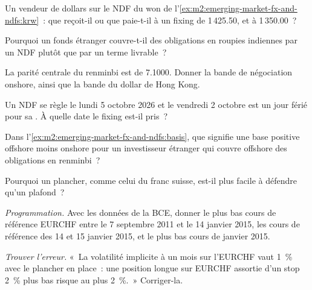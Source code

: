 \begin{exercise}[$\star$]\label{exo:m2:emerging-market-fx-and-ndfs:1}
Un vendeur de dollars sur le NDF du won de l'\cref{ex:m2:emerging-market-fx-and-ndfs:krw}~:
que reçoit-il ou que paie-t-il à un fixing de 1\,425.50, et à 1\,350.00~?
\end{exercise}

\begin{exercise}[$\star$]\label{exo:m2:emerging-market-fx-and-ndfs:2}
Pourquoi un fonds étranger couvre-t-il des obligations en roupies indiennes par un NDF plutôt
que par un terme livrable~?
\end{exercise}

\begin{exercise}[$\star$]\label{exo:m2:emerging-market-fx-and-ndfs:3}
La parité centrale du renminbi est de 7.1000. Donner la bande de négociation onshore, ainsi que la
bande du dollar de Hong Kong.
\end{exercise}

\begin{exercise}[$\star\star$]\label{exo:m2:emerging-market-fx-and-ndfs:4}
Un NDF se règle le lundi 5 octobre 2026 et le vendredi 2 octobre est un jour férié pour sa
. À quelle date le fixing est-il pris~?
\end{exercise}

\begin{exercise}[$\star\star$]\label{exo:m2:emerging-market-fx-and-ndfs:5}
Dans l'\cref{ex:m2:emerging-market-fx-and-ndfs:basis}, que signifie une base positive
offshore moins onshore pour un investisseur étranger qui couvre offshore des
obligations en renminbi~?
\end{exercise}

\begin{exercise}[$\star\star$]\label{exo:m2:emerging-market-fx-and-ndfs:6}
Pourquoi un plancher, comme celui du franc suisse, est-il plus facile à défendre qu'un plafond~?
\end{exercise}

\begin{exercise}[$\star\star\star$]\label{exo:m2:emerging-market-fx-and-ndfs:7}
\emph{Programmation.} Avec les données de la BCE, donner le plus bas cours de référence EURCHF
entre le 7 septembre 2011 et le 14 janvier 2015, les cours de référence des 14 et 15 janvier
2015, et le plus bas cours de janvier 2015.
\end{exercise}

\begin{exercise}[$\star\star\star$]\label{exo:m2:emerging-market-fx-and-ndfs:8}
\emph{Trouver l'erreur.} «~La volatilité implicite à un mois sur l'EURCHF vaut 1~\% avec
le plancher en place~: une position longue sur EURCHF assortie d'un stop 2~\% plus bas risque au plus 2~\%.~»
Corriger-la.
\end{exercise}

